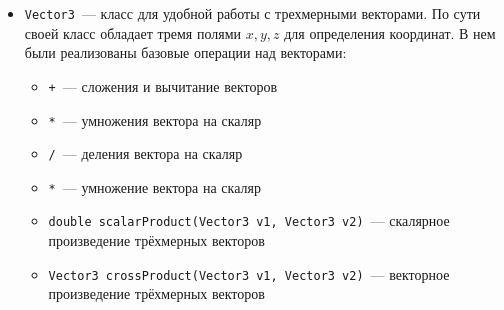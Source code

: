 \documentclass[a4paper,12pt]{article}
\numberwithin{figure}{subsubsection}
\begin{document}
\begin{itemize}
    \item \texttt{Vector3}~--- класс для удобной работы с трехмерными векторами. По сути своей класс обладает тремя полями $x,y,z$ для определения координат. В нем были реализованы базовые операции над векторами: 
    \begin{itemize}
      \sloppy
        \item \texttt{+}~--- сложения и вычитание векторов
        \item \texttt{*}~--- умножения вектора на скаляр
        \item \texttt{/}~--- деления вектора на скаляр
        \item \texttt{*}~--- умножение вектора на скаляр
        \item \texttt{double scalarProduct(Vector3 v1, Vector3 v2)}~--- скалярное произведение трёхмерных векторов
        \item \texttt{Vector3 crossProduct(Vector3 v1, Vector3 v2)}~--- векторное произведение трёхмерных векторов
  

\end{itemize}
\end{itemize}
\end{document}
